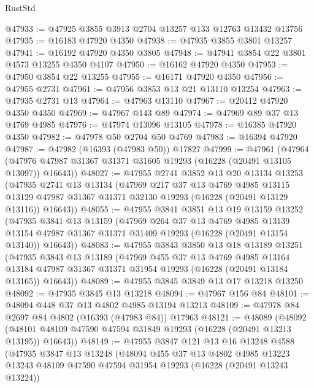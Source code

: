 \begin{lexlean}{RustStd}
\begin{coremodule}
@47933 := @47925 @3855 @3913 @2704 @13257 @133 @12763 @13432 @13756
@47935 := @16183 @47920 @4350
@47938 := @47935 @3855 @3801 @13257
@47941 := @16192 @47920 @4350 @3805
@47948 := @47941 @3854 @22 @3801 @4573 @13255 @4350 @4107
@47950 := @16162 @47920 @4350
@47953 := @47950 @3854 @22 @13255
@47955 := @16171 @47920 @4350
@47956 := @47955 @2731
@47961 := @47956 @3853 @13 @21 @13110 @13254
@47963 := @47935 @2731 @13
@47964 := @47963 @13110
@47967 := @20412 @47920 @4350 @4350
@47969 := @47967 @143 @89
@47974 := @47969 @89 @37 @13 @4769 @4985
@47976 := @47974 @13096 @13105
@47978 := @16385 @47920 @4350
@47982 := @47978 @50 @2704 @50 @4769
@47983 := @16394 @47920
@47987 := @47982 (@16393 (@47983 @50)) @17827
@47999 := @47961
    (@47964 (@47976 @47987 @31367 @31371 @31605 @19293 (@16228 (@20491 @13105 @13097)) @16643))
@48027 := @47955
    @2741
    @3852
    @13
    @20
    @13134
    @13253
    (@47935
      @2741
      @13
      @13134
      (@47969
        @217
        @37
        @13
        @4769
        @4985
        @13115
        @13129
        @47987
        @31367
        @31371
        @32130
        @19293
        (@16228 (@20491 @13129 @13116))
        @16643))
@48055 := @47955
    @3841
    @3851
    @13
    @19
    @13159
    @13252
    (@47935
      @3841
      @13
      @13159
      (@47969
        @264
        @37
        @13
        @4769
        @4985
        @13139
        @13154
        @47987
        @31367
        @31371
        @31409
        @19293
        (@16228 (@20491 @13154 @13140))
        @16643))
@48083 := @47955
    @3843
    @3850
    @13
    @18
    @13189
    @13251
    (@47935
      @3843
      @13
      @13189
      (@47969
        @455
        @37
        @13
        @4769
        @4985
        @13164
        @13184
        @47987
        @31367
        @31371
        @31954
        @19293
        (@16228 (@20491 @13184 @13165))
        @16643))
@48089 := @47955 @3845 @3849 @13 @17 @13218 @13250
@48092 := @47935 @3845 @13 @13218
@48094 := @47967 @156 @84
@48101 := @48094 @448 @37 @13 @4802 @4985 @13194 @13213
@48109 := @47978 @84 @2697 @84 @4802 (@16393 (@47983 @84)) @17963
@48121 := @48089
    (@48092 (@48101 @48109 @47590 @47594 @31849 @19293 (@16228 (@20491 @13213 @13195)) @16643))
@48149 := @47955
    @3847
    @121
    @13
    @16
    @13248
    @4588
    (@47935
      @3847
      @13
      @13248
      (@48094
        @455
        @37
        @13
        @4802
        @4985
        @13223
        @13243
        @48109
        @47590
        @47594
        @31954
        @19293
        (@16228 (@20491 @13243 @13224))

\end{coremodule}
\end{lexlean}
